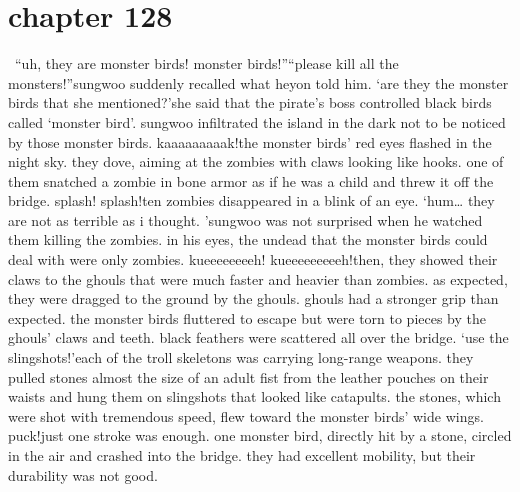 \section{chapter 128}






 “uh, they are monster birds! monster birds!”“please kill all the monsters!”sungwoo suddenly recalled what heyon told him.
‘are they the monster birds that she mentioned?’she said that the pirate’s boss controlled black birds called ‘monster bird’.
 sungwoo infiltrated the island in the dark not to be noticed by those monster birds.
kaaaaaaaaak!the monster birds’ red eyes flashed in the night sky.
 they dove, aiming at the zombies with claws looking like hooks.
one of them snatched a zombie in bone armor as if he was a child and threw it off the bridge.
splash! splash!ten zombies disappeared in a blink of an eye.
‘hum… they are not as terrible as i thought.
’sungwoo was not surprised when he watched them killing the zombies.
 in his eyes, the undead that the monster birds could deal with were only zombies.
kueeeeeeeeh! kueeeeeeeeeh!then, they showed their claws to the ghouls that were much faster and heavier than zombies.
as expected, they were dragged to the ground by the ghouls.
 ghouls had a stronger grip than expected.
the monster birds fluttered to escape but were torn to pieces by the ghouls’ claws and teeth.
 black feathers were scattered all over the bridge.
‘use the slingshots!’each of the troll skeletons was carrying long-range weapons.
they pulled stones almost the size of an adult fist from the leather pouches on their waists and hung them on slingshots that looked like catapults.
the stones, which were shot with tremendous speed, flew toward the monster birds’ wide wings.
puck!just one stroke was enough.
 one monster bird, directly hit by a stone, circled in the air and crashed into the bridge.
 they had excellent mobility, but their durability was not good.

